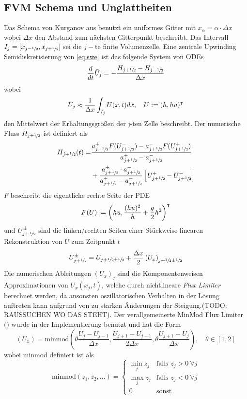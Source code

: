 \subsection{FVM Schema und Unglattheiten}
\label{sec:fvmFluxEigen}
Das Schema von Kurganov aus \cite{kurganov2007second} benutzt ein uniformes Gitter mit $x_\alpha=\alpha\cdot \Delta x$ wobei $\Delta x$ den Abstand zum nächsten Gitterpunkt beschreibt. Das Intervall $I_j = [x_{j-\sfrac{1}{2}},x_{j+\sfrac{1}{2}}]$ sei die $j-$te finite Volumenzelle.
Eine zentrale Upwinding Semidiskretisierung von \eqref{eq:swe} ist das folgende System von ODEs
\[
 \frac{d}{dt} \bar U_j = - \frac{H_{j+\sfrac{1}{2}}-H_{j-\sfrac{1}{2}}}{\Delta x}
\]
wobei 
\[
 \bar U_j \approx \frac{1}{\Delta x}\int_{I_j} U(x,t) dx, \quad U:=(h,hu)^\intercal
\]
den Mittelwert der Erhaltungsgrößen der j-ten Zelle beschreibt. Der numerische Fluss $H_{j+\sfrac{1}{2}}$ ist definiert als
\[
\begin{aligned}
 H_{j+\sfrac{1}{2}}(t) =& \frac{a^+_{j+\sfrac{1}{2}}F(U^-_{j+\sfrac{1}{2}}) - a^-_{j+\sfrac{1}{2}}F(U^+_{j+\sfrac{1}{2}})}{a^+_{j+\sfrac{1}{2}} -a^-_{j+\sfrac{1}{2}}} \\
 & +\frac{a^+_{j+\sfrac{1}{2}} \cdot a^-_{j+\sfrac{1}{2}}}{a^+_{j+\sfrac{1}{2}} -a^-_{j+\sfrac{1}{2}}}\left[U^+_{j+\sfrac{1}{2}} - U^-_{j+\sfrac{1}{2}}\right]
\end{aligned}
 \]
$F$ beschreibt die eigentliche rechte Seite der PDE
\[
 F(U) := \left( hu, \frac{(hu)^2}{h}  +\frac{g}{2} h^2 \right)^\intercal
\]
und $U^\pm_{j+\sfrac{1}{2}}$ sind die linken/rechten Seiten einer Stückweise linearen Rekonstruktion von $U$ zum Zeitpunkt $t$
\[
 U^\pm_{j+\sfrac{1}{2}} = U_{j+\sfrac{1}{2} \pm \sfrac{1}{2}} + \frac{\Delta x}{2} \left(U_x\right)_{j+\sfrac{1}{2}\pm\sfrac{1}{2}}
\]
Die numerischen Ableitungen $(U_x)_j$ sind die Komponentenweisen Approximationen von $U_x(x_j ,t)$, welche durch nichtlineare \textit{Flux Limiter} berechnet werden, 
da ansonsten oszillatorischen Verhalten in der Lösung auftreten kann aufgrund von zu starken Änderungen der Steigung.(TODO: RAUSSUCHEN WO DAS STEHT).
Der verallgemeinerte MinMod Flux Limiter (\cite[(4.9)]{kurganov2000new}) wurde in der Implementierung benutzt und hat die Form
\[
 \left(U_x\right) = \text{minmod}\left(\theta \frac{\bar U_j- \bar U_{j-1}}{\Delta x},\frac{\bar U_{j+1}- \bar U_{j-1}}{2\Delta x},\theta\frac{ \bar U_{j+1}- \bar U_{j}}{\Delta x}  \right), \quad \theta \in [1,2]
\]
wobei minmod definiert ist als
\[
 \text{minmod}(z_1,z_2,\ldots) = \begin{cases}
                                  \min_j z_j & \text{falls }z_j>0~\forall j\\
                                  \max_j z_j & \text{falls }z_j<0~\forall j\\
                                  0 & \text{sonst}
                                 \end{cases}
 \]
 
